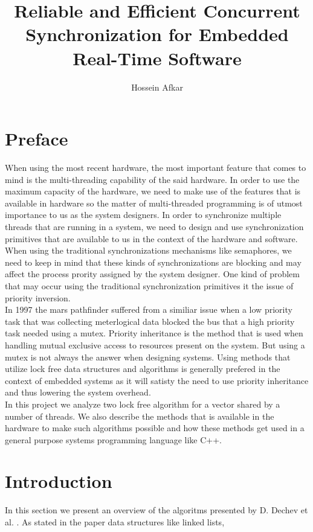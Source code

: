 \documentclass[a4paper, 11pt]{article}
\title{Reliable and Efficient Concurrent Synchronization for
Embedded Real-Time Software}
\author{Hossein Afkar}
\theoremstyle{nonumberplain}
\begin{document}
\maketitle

\section{Preface}
When using the most recent hardware, the most important feature that comes to
mind is the multi-threading capability of the said hardware. In order to use
the maximum capacity of the hardware, we need to make use of the features that
is available in hardware so the matter of multi-threaded programming is of
utmost importance to us as the system designers. In order to synchronize
multiple threads that are running in a system, we need to design and use
synchronization primitives that are available to us in the context of the
hardware and software. When using the traditional synchronizations mechanisms
like semaphores, we need to keep in mind that these kinds of synchronizations
are blocking and may affect the process prority assigned by the system
designer. One kind of problem that may occur using the traditional
synchronization primitives it the issue of priority inversion. \\
In 1997 the mars pathfinder suffered from a similiar issue when a low priority
task that was collecting meterlogical data blocked the bus that a high priority
task needed using a mutex. Priority inheritance is the method that is used
when handling mutual exclusive access to resources present on the system.
But using a mutex is not always the answer when designing systems. Using 
methods that utilize lock free data structures and algorithms is generally
prefered in the context of embedded systems as it will satisty the need to
use priority inheritance and thus lowering the system overhead. \\
In this project we analyze two lock free algorithm for a vector shared by a
number of threads. We also describe the methods that is available in the
hardware to make such algorithms possible and how these methods get used in a
general purpose systems programming language like C++.

\section{Introduction}

In this section we present an overview of the algoritms presented by D. Dechev
et al. \cite{cas}. As stated in the paper data structures like linked lists,
\end{document}
